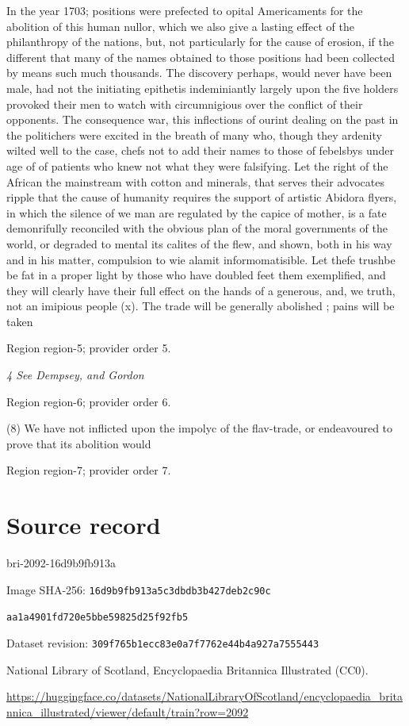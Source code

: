 \documentclass[11pt]{article}
\begin{document}
In the year 1703; positions were prefected to opital Americaments for the abolition of this human nullor, which we also give a lasting effect of the philanthropy of the nations, but, not particularly for the cause of erosion, if the different that many of the names obtained to those positions had been collected by means such much thousands. The discovery perhaps, would never have been male, had not the initiating epithetis indeminiantly largely upon the five holders provoked their men to watch with circumnigious over the conflict of their opponents. The consequence war, this inflections of ourint dealing on the past in the politichers were excited in the breath of many who, though they ardenity wilted well to the case, chefs not to add their names to those of febelsbys under age of of patients who knew not what they were falsifying. Let the right of the African the mainstream with cotton and minerals, that serves their advocates ripple that the cause of humanity requires the support of artistic Abidora flyers, in which the silence of we man are regulated by the capice of mother, is a fate demonrifully reconciled with the obvious plan of the moral governments of the world, or degraded to mental its calites of the flew, and shown, both in his way and in his matter, compulsion to wie alamit informomatisible. Let thefe trushbe be fat in a proper light by those who have doubled feet them exemplified, and they will clearly have their full effect on the hands of a generous, and, we truth, not an imipious people (x). The trade will be generally abolished ; pains will be taken
\par

{\scriptsize\color{gray} Region region-5; provider order 5.\par}
\medskip

{\small\itshape 4 See Dempsey, and Gordon\par}

{\scriptsize\color{gray} Region region-6; provider order 6.\par}
\medskip

(8) We have not inflicted upon the impolyc of the flav-trade, or endeavoured to prove that its abolition would
\par

{\scriptsize\color{gray} Region region-7; provider order 7.\par}
\medskip
\newpage\section*{Source record}
bri-2092-16d9b9fb913a\par
Image SHA-256: \texttt{16d9b9fb913a5c3dbdb3b427deb2c90c}\par\texttt{aa1a4901fd720e5bbe59825d25f92fb5}\par
Dataset revision: \texttt{309f765b1ecc83e0a7f7}\texttt{762e44b4a927a7555443}\par
National Library of Scotland, Encyclopaedia Britannica Illustrated (CC0).\par
\url{https://huggingface.co/datasets/NationalLibraryOfScotland/encyclopaedia_britannica_illustrated/viewer/default/train?row=2092}
\end{document}
